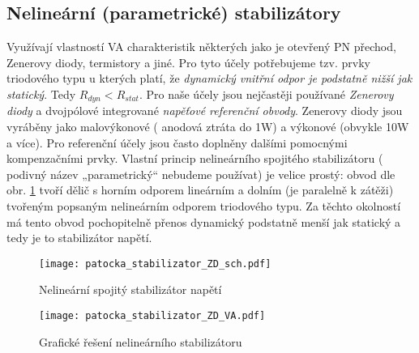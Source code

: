 {    \subsection{Nelineární (parametrické) stabilizátory}
      Využívají vlastností VA charakteristik některých jako je otevřený PN přechod, Zenerovy diody, termistory a jiné. Pro tyto účely potřebujeme tzv. prvky triodového typu u kterých platí, že \emph{dynamický vnitřní odpor je podstatně nižší jak statický}. Tedy $R_{dyn} < R_{stat}$. Pro naše účely jsou nejčastěji používané \emph{Zenerovy diody} a dvojpólové integrované \emph{napěťové referenční obvody}. Zenerovy diody jsou vyráběny jako malovýkonové ( anodová ztráta do 1W) a výkonové (obvykle 10W a více). Pro referenční účely jsou často doplněny dalšími pomocnými kompenzačními prvky. Vlastní princip nelineární\-ho spojitého stabilizátoru ( podivný název „parametrický“ nebudeme použí\-vat) je velice prostý: obvod dle obr. \ref{enz:fig_sch_ZD_stab} tvoří dělič s horním odporem lineárním a dolním (je paralelně k zátěži) tvořeným popsaným nelineárním odporem triodového typu. Za těchto okolností má tento obvod pochopitelně přenos dynamický podstatně menší jak statický a tedy je to stabilizátor napětí.

      \begin{figure}[ht!]
         \centering
         \texttt{[image: patocka\_stabilizator\_ZD\_sch.pdf]}
         \caption{Nelineární spojitý stabilizátor napětí}
         \label{enz:fig_sch_ZD_stab}
       \end{figure}

      \begin{figure}[ht!]
         \centering
         \texttt{[image: patocka\_stabilizator\_ZD\_VA.pdf]}
         \caption{Grafické řešení nelineárního stabilizátoru}
         \label{enz:fig_graf_res_ZD_stab}
       \end{figure}

}
